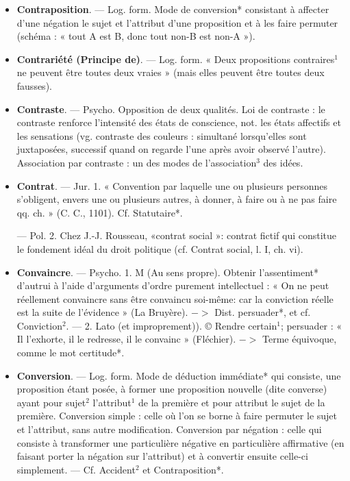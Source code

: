\begin{itemize}[leftmargin=1cm, label=, itemsep=11pt]
\item {\bf Contraposition}. — Log. form. Mode
de conversion* consistant à affecter
d’une négation le sujet et l’attribut
d'une proposition et à les faire permuter (schéma : « tout A est B,
donc tout non-B est non-A »).

\item {\bf Contrariété (Principe de)}. — Log.
form. « Deux propositions contraires$^1$
ne peuvent être toutes deux vraies »
(mais elles peuvent être toutes deux
fausses).

\item {\bf Contraste}. — Psycho. Opposition de
deux qualités. Loi de contraste : le
contraste renforce l'intensité des
états de conscience, not. les états
affectifs et les sensations (vg. contraste des couleurs : simultané lorsqu’elles sont juxtaposées, successif
quand on regarde l’une après avoir
observé l’autre). Association par contraste :
un des modes de l’association$^3$ des idées.

\item {\bf Contrat}. — Jur. 1. « Convention par
laquelle une ou plusieurs personnes
s’obligent, envers une ou plusieurs
autres, à donner, à faire ou à ne
pas faire qq. ch. » (C. C., 1101). Cf.
Statutaire*.

— Pol. 2. Chez J.-J. Rousseau,
«contrat social »: contrat fictif qui
constitue le fondement idéal du
droit politique (cf. Contrat social,
l. I, ch. vi).

\item {\bf Convaincre}. — Psycho. 1. M (Au sens
propre). Obtenir  l’assentiment*
d'autrui à l’aide d'arguments d'ordre
purement intellectuel : « On ne peut
réellement convaincre sans être
convaincu soi-même: car la conviction réelle est la suite de l'évidence »
(La Bruyère). $->$ Dist. persuader*,
et cf. Conviction$^2$. — 2. Lato (et
improprement)). © Rendre certain$^1$;
persuader : « Il l’exhorte, il le redresse, il le convainc » (Fléchier).
$->$ Terme équivoque, comme le
mot certitude*.

\item {\bf Conversion}. — Log. form. Mode de
déduction immédiate* qui consiste,
une proposition étant posée, à former une proposition nouvelle (dite
converse) ayant pour sujet$^2$ l'attribut$^1$ de la première et pour attribut le sujet de la première. Conversion simple : celle où l’on se borne à
faire permuter le sujet et l’attribut,
sans autre modification. Conversion
par négation : celle qui consiste à
transformer une particulière négative en particulière affirmative (en
faisant porter la négation sur l’attribut) et à convertir ensuite celle-ci
simplement. — Cf. Accident$^2$ et
Contraposition*.


\end{itemize}
